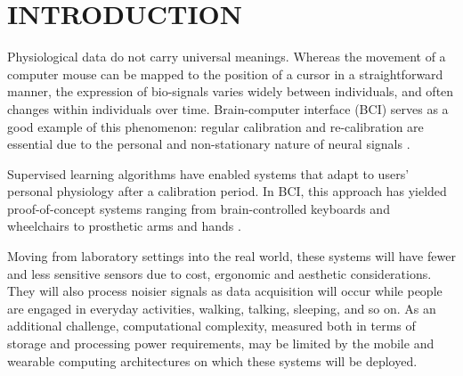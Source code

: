 \section{\uppercase{Introduction}}
\label{sec:introduction}

\noindent Physiological data do not carry universal meanings. Whereas the movement of a computer mouse can be mapped to the position of a cursor in a straightforward manner, the expression of bio-signals varies widely between individuals, and often changes within individuals over time. Brain-computer interface (BCI) serves as a good example of this phenomenon: regular calibration and re-calibration are essential due to the personal and non-stationary nature of neural signals \cite{dornhege_toward_2007,mcfarland_brain-computer_2011}.

Supervised learning algorithms have enabled systems that adapt to users' personal physiology after a calibration period. In BCI, this approach has yielded proof-of-concept systems ranging from brain-controlled keyboards and wheelchairs to prosthetic arms and hands \cite{blankertz_note_2007,millan_combining_2010,d._mattia_brain_2011,hill_practical_2014,campbell_neurophone:_2010}. 



Moving from laboratory settings into the real world, these systems will have fewer and less sensitive sensors due to cost, ergonomic and aesthetic considerations. They will also process noisier signals as data acquisition will occur while people are engaged in everyday activities, walking, talking, sleeping, and so on. As an additional challenge, computational complexity, measured both in terms of storage and processing power requirements, may be limited by the mobile and wearable computing architectures on which these systems will be deployed. 

